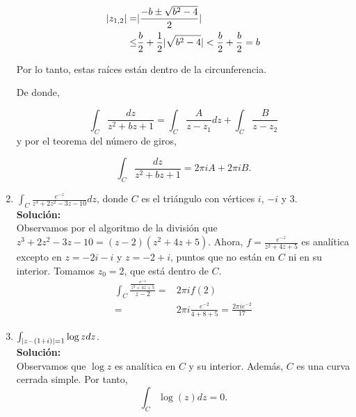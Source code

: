 \begin{enumerate}
		\begin{align*}
			\lvert z_{1,2}\rvert=&\lvert \frac{-b \pm \sqrt{b^{2}-4}}{2}\rvert \\
			\leq & \frac{b}{2} + \frac{1}{2} \lvert\sqrt{b^{2}-4}\rvert < \frac{b}{2} + \frac{b}{2} = b
		\end{align*}
		
		Por lo tanto, estas raíces están dentro de la circunferencia.
		
		De donde,
		
		$$\int_{C} \frac{dz}{z^{2}+bz+1}=\int_{C}\frac{A}{z-z_{1}}dz+\int_{C}\frac{B}{z-z_{2}}$$
		y por el teorema del número de giros,
		
		$$\int_{C} \frac{dz}{z^{2}+bz+1}=2\pi i A + 2 \pi i B.$$
		
		\item $\int_{C} \frac{e^{-z}}{z^{3}+2z^{2}-3z-10}dz$, donde $C$ es el triángulo con vértices $i$, $-i$ y $3$.
		\\ \textbf{Solución:} \\
		Observamos por el algoritmo de la división que $z^{3}+2z^{2}-3z-10=(z-2)(z^{2}+4z+5)$.	
		Ahora, $f=\frac{e^{-z}}{z^{2}+4z+5}$ es analítica excepto en $z=-2i-i$ y $z=-2+i$, puntos que no están en $C$ ni en su interior.
		Tomamos $z_{0}=2$, que está dentro de $C$.
		\begin{align*}
			\int_{C} \frac{\frac{e^{-z}}{z^{2}+4z+5}}{z-2} =& 2\pi i f(2) \\
			=& 2 \pi i \frac{e^{-2}}{4+8+5} = \frac{2\pi i e^{-2}}{17}
		\end{align*}
		\item $\int_{\lvert z-(1+i)\rvert=1} \log{z}dz$.
		\\ \textbf{Solución:} \\
		
		Observamos que $\log{z}$ es analítica en $C$ y su interior. Además, $C$ es una curva cerrada simple. Por tanto,
		$$\int_{C} \log(z)dz=0.$$
		

\end{enumerate}
